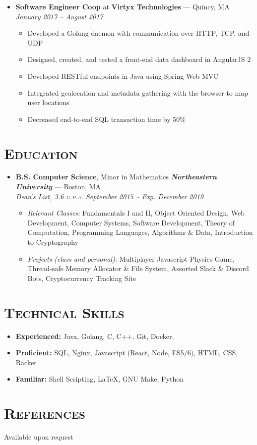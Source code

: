 \documentclass{article}
\begin{document}
\begin{itemize}[label={},leftmargin=*]
  \item \textbf{Software Engineer Coop} at \textbf{Virtyx Technologies} --- Quincy, MA \hfill {\em January 2017 -- August 2017}
  \begin{itemize}[label={$\bullet$}]
    \item Developed a Golang daemon with communication over HTTP, TCP, and UDP
    \item Designed, created, and tested a front-end data dashboard in AngularJS 2
    \item Developed RESTful endpoints in Java using Spring Web MVC
    \item Integrated geolocation and metadata gathering with the browser to map user locations
    \item Decreased end-to-end SQL transaction time by 50\%
  \end{itemize}
\end{itemize}

\section*{\textsc{Education}}
\begin{itemize}[label={},leftmargin=*]
  \item \textbf{B.S. Computer Science}, Minor in Mathematics \hfill \textit{\textbf{Northeastern University}} --- Boston, MA \\
  \em{Dean's List}, 3.6 \textsc{g.p.a.}  \hfill \em{\textit{September 2015 -- Exp. December 2019}}
  \begin{itemize}
    \item[] \textit{Relevant Classes:} Fundamentals I and II, Object Oriented Design, Web Development, Computer Systems, Software Development, Theory of Computation, Programming Languages, Algorithms \& Data, Introduction to Cryptography\\
    \item[] \textit{Projects (class and personal):} Multiplayer Javascript Physics Game, Thread-safe Memory Allocator \& File System, Assorted Slack \& Discord Bots, Cryptocurrency Tracking Site
  \end{itemize}
\end{itemize}

\section*{\textsc{Technical Skills}}
\begin{itemize}[label={},leftmargin=*]
  \item \textbf{Experienced:} Java, Golang, C, C++, Git, Docker, 
  \item \textbf{Proficient:} SQL, Nginx, Javascript (React, Node, ES5/6), HTML, CSS, Racket
  \item \textbf{Familiar:} Shell Scripting, LaTeX, GNU Make, Python
\end{itemize}

\section*{\textsc{References}}
Available upon request
\end{document}
